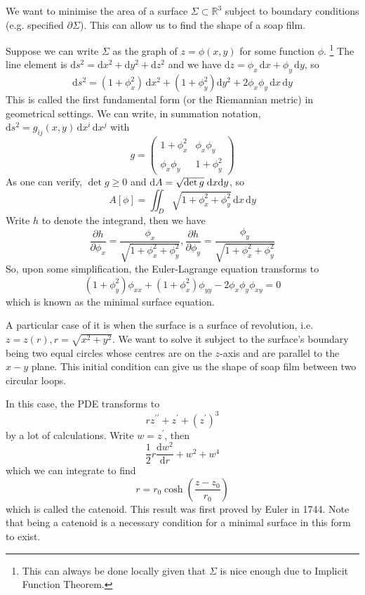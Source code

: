\documentclass[a4paper]{article}
\begin{document}
\begin{example}
    We want to minimise the area of a surface $\Sigma\subset\mathbb R^3$ subject to boundary conditions (e.g. specified $\partial\Sigma$).
    This can allow us to find the shape of a soap film.

    Suppose we can write $\Sigma$ as the graph of $z=\phi(x,y)$ for some function $\phi$.
    \footnote{This can always be done locally given that $\Sigma$ is nice enough due to Implicit Function Theorem.}
    The line element is $\mathrm ds^2=\mathrm dx^2+\mathrm dy^2+\mathrm dz^2$ and we have $\mathrm dz=\phi_x\,\mathrm dx+\phi_y\,\mathrm dy$, so
    $$\mathrm ds^2=(1+\phi_x^2)\,\mathrm dx^2+(1+\phi_y^2)\mathrm dy^2+2\phi_x\phi_y\,\mathrm dx\,\mathrm dy$$
    This is called the first fundamental form (or the Riemannian metric) in geometrical settings.
    We can write, in summation notation, $\mathrm ds^2=g_{ij}(x,y)\,\mathrm dx^i\,\mathrm dx^j$ with
    $$g=\begin{pmatrix}
            1+\phi_x^2&\phi_x\phi_y\\
            \phi_x\phi_y&1+\phi_y^2
    \end{pmatrix}$$
    As one can verify, $\det g\ge 0$ and $ \mathrm{d} A = \sqrt{\det g}\;\mathrm{d} x\mathrm{d} y $, so
    $$A[\phi]=\iint_D\sqrt{1+\phi_x^2+\phi_y^2}\,\mathrm dx\,\mathrm dy$$
    Write $h$ to denote the integrand, then we have
    $$\frac{\partial h}{\partial\phi_x}=\frac{\phi_x}{\sqrt{1+\phi_x^2+\phi_y^2}},\frac{\partial h}{\partial\phi_y}=\frac{\phi_y}{\sqrt{1+\phi_x^2+\phi_y^2}}$$
    So, upon some simplification, the Euler-Lagrange equation transforms to
    $$(1+\phi_y^2)\phi_{xx}+(1+\phi_x^2)\phi_{yy}-2\phi_x\phi_y\phi_{xy}=0$$
    which is known as the minimal surface equation.

    A particular case of it is when the surface is a surface of revolution, i.e. $z=z(r),r=\sqrt{x^2+y^2}$.
    We want to solve it subject to the surface's boundary being two equal circles whose centres are on the $z$-axis and are parallel to the $x-y$ plane.
    This initial condition can give us the shape of soap film between two circular loops.

    In this case, the PDE transforms to
    $$rz^{\prime\prime}+z^\prime+(z^\prime)^3$$
    by a lot of calculations.
    Write $w=z^\prime$, then
    $$\frac{1}{2}r\frac{\mathrm dw^2}{\mathrm dr}+w^2+w^4$$
    which we can integrate to find
    $$r=r_0\cosh\left( \frac{z-z_0}{r_0} \right)$$
    which is called the catenoid.
    This result was first proved by Euler in 1744.
    Note that being a catenoid is a necessary condition for a minimal surface in this form to exist.


\end{example}
\end{document}
